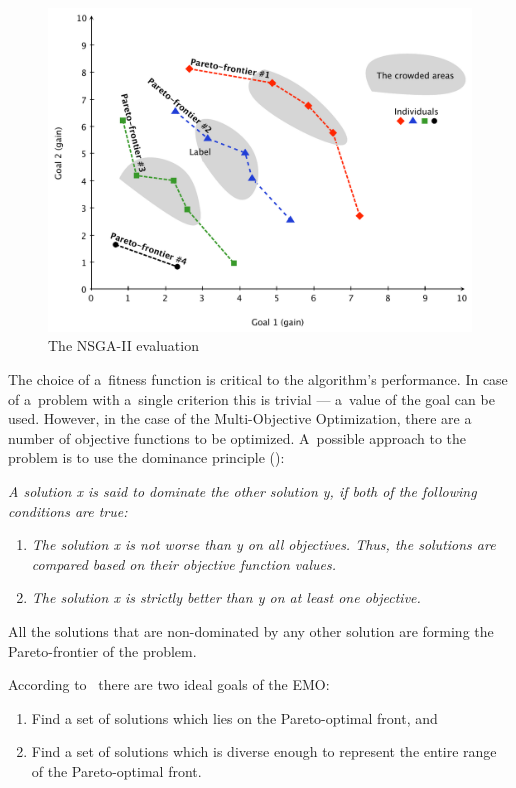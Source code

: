 \begin{figure}
  \centering \includegraphics[scale=0.55]{img/nsga}
  \caption{The NSGA-II evaluation}
  \label{nsga}
\end{figure}

The choice of a~fitness function is critical to the algorithm's
performance. In case of a~problem with a~single criterion this is trivial ---
a~value of the goal can be used. However, in the case of the Multi-Objective
Optimization, there are a number of objective functions to be
optimized. A~possible approach to the problem is to use the dominance
principle (\cite{Gol89}):

\vspace{0.5cm} \textit{A solution x is said to dominate the other solution y,
  if both of the following conditions are true:}
\begin{enumerate}
\item \textit{The solution x is not worse than y on all objectives. Thus, the
    solutions are compared based on their objective function values.}
\item \textit{The solution x is strictly better than y on at least one
    objective.}
\end{enumerate}

All the solutions that are non-dominated by any other solution are forming the
Pareto-frontier of the problem.

According to~\cite{Deb08} there are two ideal goals of the EMO:
\begin{enumerate}
\item Find a set of solutions which lies on the Pareto-optimal front, and
\item Find a set of solutions which is diverse enough to represent the entire
  range of the Pareto-optimal front.
\end{enumerate}

